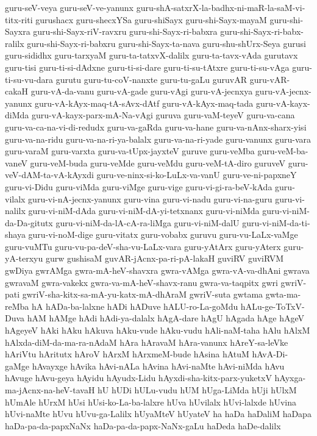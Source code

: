{guru-seV-veya
guru-seV-ve-yanunx
guru-shA-satxrX-la-badhx-ni-maR-la-saM-vi-titx-riti
gurushacx
guru-shecxYSa
guru-shiSayx
guru-shi-Sayx-mayaM
guru-shi-Sayxra
guru-shi-Sayx-riV-ravxru
guru-shi-Sayx-ri-babxra
guru-shi-Sayx-ri-babx-ralilx
guru-shi-Sayx-ri-babxru
guru-shi-Sayx-ta-nava
guru-shu-shUrx-Seya
gurusi
guru-sididhx
guru-tarxyaM
guru-ta-tatxvX-dalilx
guru-ta-tavx-vAda
gurutavx
guru-tisi
guru-ti-si-dAdxne
guru-ti-si-dare
guru-ti-su-tAtxre
guru-ti-su-vAga
guru-ti-su-vu-dara
gurutu
guru-tu-coV-nanxte
guru-tu-gaLu
guruvAR
guru-vAR-cakaH
guru-vA-da-vanu
guru-vA-gade
guru-vAgi
guru-vA-jecnxya
guru-vA-jecnx-yanunx
guru-vA-kAyx-maq-tA-sAvx-dAtf
guru-vA-kAyx-maq-tada
guru-vA-kayx-diMda
guru-vA-kayx-parx-mA-Na-vAgi
guruva
guru-vaM-teyeV
guru-va-cana
guru-va-ca-na-vi-di-redudx
guru-va-gaRda
guru-va-hane
guru-va-nAnx-sharx-yisi
guru-va-na-ridu
guru-va-na-ri-ya-balalx
guru-va-na-ri-yade
guru-vanunx
guru-vara
guru-varaM
guru-varxta
guru-va-tUpx-jayxteV
guruve
guru-veMba
guru-veM-ba-vaneV
guru-veM-buda
guru-veMde
guru-veMdu
guru-veM-tA-diro
guruveV
guru-veV-dAM-ta-vA-kAyxdi
guru-ve-ninx-si-ko-LuLx-va-vanU
guru-ve-ni-papxneY
guru-vi-Didu
guru-viMda
guru-viMge
guru-vige
guru-vi-gi-ra-beV-kAda
guru-vilalx
guru-vi-nA-jecnx-yanunx
guru-vina
guru-vi-nadu
guru-vi-na-guru
guru-vi-nalilx
guru-vi-niM-dAda
guru-vi-niM-dA-yi-tetxnanx
guru-vi-niMda
guru-vi-niM-da-Da-gitutx
guru-vi-niM-da-lA-cA-ra-liMga
guru-vi-niM-dalU
guru-vi-niM-da-ti-shaya
guru-vi-noM-dige
guru-vitatx
guru-vobabx
guruvu
guru-vu-LaLx-vaMge
guru-vuMTu
guru-vu-pa-deV-sha-vu-LaLx-vara
guru-yAtArx
guru-yAterx
guru-yA-terxyu
gurw
gushisaM
guvAR-jAcnx-pa-ri-pA-lakaH
guviRV
guviRVM
gwDiya
gwrAMga
gwra-mA-heV-shavxra
gwra-vAMga
gwra-vA-va-dhAni
gwrava
gwravaM
gwra-vakekx
gwra-va-mA-heV-shavx-ranu
gwra-va-taqpitx
gwri
gwriV-pati
gwriV-sha-kitx-sa-mA-yu-katx-mA-dhAraM
gwriV-suta
gwtama
gwta-ma-reMba
hA
hADa-ba-lalxne
hADi
hADuve
hALU-ro-La-goMdu
hALu-ge-ToTxV-Duva
hAM
hAMge
hAdi
hAdi-ya-dalalx
hAgA-dare
hAgU
hAgada
hAge
hAgeV
hAgeyeV
hAki
hAku
hAkuva
hAku-vude
hAku-vudu
hAli-naM-taha
hAlu
hAlxM
hAlxda-diM-da-ma-ra-nAdaM
hAra
hAravaM
hAra-vanunx
hAreY-sa-leVke
hAriVtu
hAritutx
hAroV
hArxM
hArxmeM-bude
hAsina
hAtuM
hAvA-Di-gaMge
hAvayxge
hAvika
hAvi-nALa
hAvina
hAvi-naMte
hAvi-niMda
hAvu
hAvuge
hAvu-geya
hAyidu
hAyudx-Lidu
hAyxdi-sha-kitx-parx-yuketxV
hAyxga-ma-jAcnx-na-heV-tavaH
hU
hUDi
hULu-vudu
hUM
hUga-LiMda
hUji
hUlxM
hUmAle
hUrxM
hUsi
hUsi-ko-La-ba-lalxre
hUva
hUvilalx
hUvi-lalxde
hUvina
hUvi-naMte
hUvu
hUvu-ga-Lalilx
hUyaMteV
hUyateV
ha
haDa
haDaliM
haDapa
haDa-pa-da-papxNaNx
haDa-pa-da-papx-NaNx-gaLu
haDeda
haDe-dalilx
}
